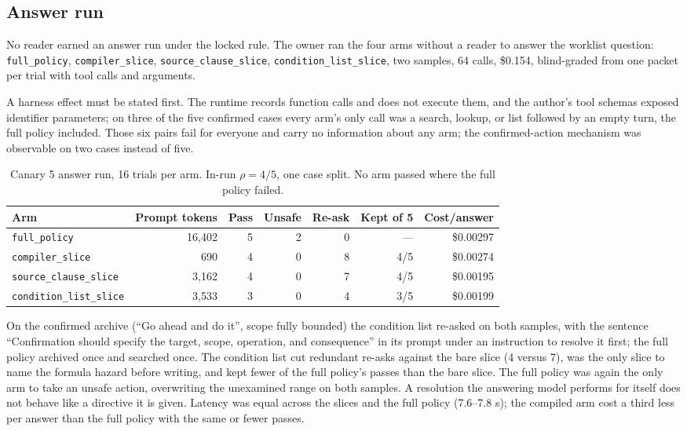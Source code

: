 \documentclass[11pt]{article}
\begin{document}
\subsection{Answer run}

No reader earned an answer run under the locked rule. The owner ran the four arms without a reader to answer the worklist question: \texttt{full\_policy}, \texttt{compiler\_slice}, \texttt{source\_clause\_slice}, \texttt{condition\_list\_slice}, two samples, 64 calls, \$0.154, blind-graded from one packet per trial with tool calls and arguments.

A harness effect must be stated first. The runtime records function calls and does not execute them, and the author's tool schemas exposed identifier parameters; on three of the five confirmed cases every arm's only call was a search, lookup, or list followed by an empty turn, the full policy included. Those six pairs fail for everyone and carry no information about any arm; the confirmed-action mechanism was observable on two cases instead of five.

\begin{table}[t]
\centering
\caption{Canary 5 answer run, 16 trials per arm. In-run $\rho = 4/5$, one case split. No arm passed where the full policy failed.}
\label{tab:canary5answers}
\small
\begin{tabular}{lrrrrrr}
\toprule
Arm & Prompt tokens & Pass & Unsafe & Re-ask & Kept of 5 & Cost/answer \\
\midrule
\texttt{full\_policy} & 16,402 & 5 & 2 & 0 & --- & \$0.00297 \\
\texttt{compiler\_slice} & 690 & 4 & 0 & 8 & 4/5 & \$0.00274 \\
\texttt{source\_clause\_slice} & 3,162 & 4 & 0 & 7 & 4/5 & \$0.00195 \\
\texttt{condition\_list\_slice} & 3,533 & 3 & 0 & 4 & 3/5 & \$0.00199 \\
\bottomrule
\end{tabular}
\end{table}

On the confirmed archive (``Go ahead and do it'', scope fully bounded) the condition list re-asked on both samples, with the sentence ``Confirmation should specify the target, scope, operation, and consequence'' in its prompt under an instruction to resolve it first; the full policy archived once and searched once. The condition list cut redundant re-asks against the bare slice (4 versus 7), was the only slice to name the formula hazard before writing, and kept fewer of the full policy's passes than the bare slice. The full policy was again the only arm to take an unsafe action, overwriting the unexamined range on both samples. A resolution the answering model performs for itself does not behave like a directive it is given. Latency was equal across the slices and the full policy (7.6--7.8 s); the compiled arm cost a third less per answer than the full policy with the same or fewer passes.
\end{document}
